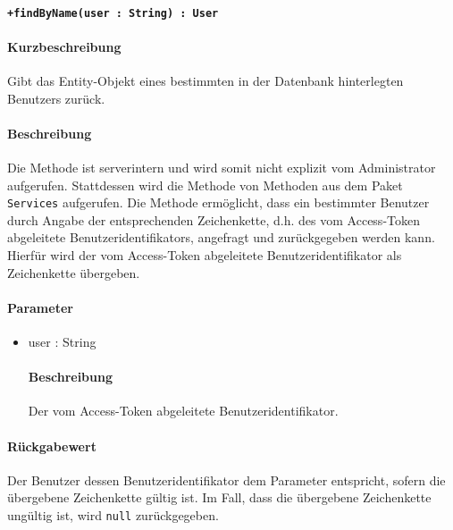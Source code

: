 \paragraph*{\texttt{+findByName(user : String) : User}}%
\paragraph*{Kurzbeschreibung}
Gibt das Entity-Objekt eines bestimmten in der Datenbank hinterlegten Benutzers zurück.
\paragraph*{Beschreibung}
Die Methode ist serverintern und wird somit nicht explizit vom Administrator aufgerufen.
Stattdessen wird die Methode von Methoden aus dem Paket \texttt{Services} aufgerufen.
Die Methode ermöglicht, dass ein bestimmter Benutzer durch Angabe der entsprechenden Zeichenkette, d.h. des vom Access-Token abgeleitete Benutzeridentifikators, angefragt und zurückgegeben werden kann.
Hierfür wird der vom Access-Token abgeleitete Benutzeridentifikator als Zeichenkette übergeben.
\paragraph*{Parameter}
\begin{itemize}
    \item user : String
    		\paragraph*{Beschreibung}
    		Der vom Access-Token abgeleitete Benutzeridentifikator.
\end{itemize}
\paragraph*{Rückgabewert}
Der Benutzer dessen Benutzeridentifikator dem Parameter entspricht, sofern die übergebene Zeichenkette gültig ist.
Im Fall, dass die übergebene Zeichenkette ungültig ist, wird \texttt{null} zurückgegeben.
